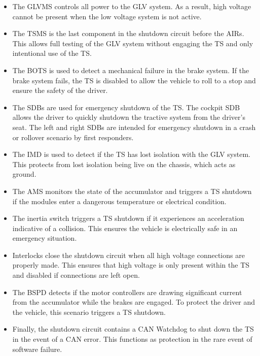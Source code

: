 \documentclass{article}
\begin{document}
                \begin{itemize}
                    \item The GLVMS controls all power to the GLV system. As a result, high voltage cannot be present when the low voltage system is not active.
                    \item The TSMS is the last component in the shutdown circuit before the AIRs. This allows full testing of the GLV system without engaging the TS and only intentional use of the TS.
                    \item The BOTS is used to detect a mechanical failure in the brake system. If the brake system fails, the TS is disabled to allow the vehicle to roll to a stop and ensure the safety of the driver.
                    \item The SDBs are used for emergency shutdown of the TS. The cockpit SDB allows the driver to quickly shutdown the tractive system from the driver's seat. The left and right SDBs are intended for emergency shutdown in a crash or rollover scenario by first responders.
                    \item The IMD is used to detect if the TS has lost isolation with the GLV system. This protects from lost isolation being live on the chassis, which acts as ground.
                    \item The AMS monitors the state of the accumulator and triggers a TS shutdown if the modules enter a dangerous temperature or electrical condition.
                    \item The inertia switch triggers a TS shutdown if it experiences an acceleration indicative of a collision. This ensures the vehicle is electrically safe in an emergency situation.
                    \item Interlocks close the shutdown circuit when all high voltage connections are properly made. This ensures that high voltage is only present within the TS and disabled if connections are left open.
                    \item The BSPD detects if the motor controllers are drawing significant current from the accumulator while the brakes are engaged. To protect the driver and the vehicle, this scenario triggers a TS shutdown.
                    \item Finally, the shutdown circuit contains a CAN Watchdog to shut down the TS in the event of a CAN error. This functions as protection in the rare event of software failure.
                \end{itemize}
\end{document}

